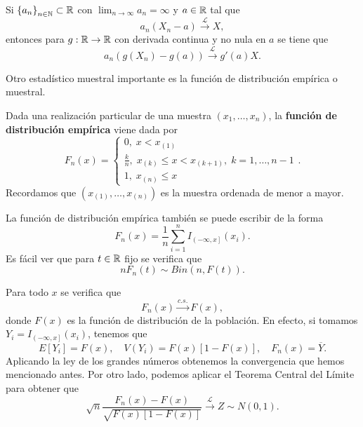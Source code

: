 \begin{lema}
	Si $\displaystyle \left\{ a_{n}\right\} _{n\in\mathbb{N}}\subset \mathbb{R} $ con $\displaystyle \lim_{n \to \infty}a_{n}=\infty $ y $\displaystyle a \in \mathbb{R} $ tal que 
	\[a_{n}\left(X_{n}-a\right)\xrightarrow{\mathcal{L}} X ,\]
	entonces para $\displaystyle g : \mathbb{R} \to \mathbb{R} $ con derivada continua y no nula en $\displaystyle a $ se tiene que 
	\[a_{n}\left(g\left(X_{n}\right)-g\left(a\right)\right)\xrightarrow{\mathcal{L}} g'\left(a\right)X .\]
\end{lema}
Otro estadístico muestral importante es la función de distribución empírica o muestral.
\begin{definition}
Dada una realización particular de una muestra $\displaystyle \left(x_{1}, \ldots, x_{n}\right) $, la \textbf{función de distribución empírica} viene dada por
\[ F_{n}\left(x\right)=
\begin{cases}
0, \; x < x_{\left(1\right)} \\
\frac{k}{n}, \; x_{\left(k\right)} \leq x < x_{\left(k+1\right)}, \; k = 1, \ldots, n-1 \\
1, \; x_{\left(n\right)}\leq x
\end{cases}
.\]
Recordamos que $\displaystyle \left(x_{\left(1\right)}, \ldots, x_{\left(n\right)}\right) $ es la muestra ordenada de menor a mayor.
\end{definition}
La función de distribución empírica también se puede escribir de la forma
\[F_{n}\left(x\right)=\frac{1}{n}\sum^{n}_{i = 1}I_{\left(-\infty, x\right]}\left(x_{i}\right) .\]
Es fácil ver que para $\displaystyle t \in \mathbb{R} $ fijo se verifica que 
\[nF_{n}\left(t\right)\sim Bin\left(n, F\left(t\right)\right) .\]
\begin{observation}
Para todo $\displaystyle x $ se verifica que 
\[F_{n}\left(x\right)\xrightarrow{c.s.}F\left(x\right) ,\]
donde $\displaystyle F\left(x\right) $ es la función de distribución de la población. En efecto, si tomamos $\displaystyle Y_{i}=I_{\left(-\infty, x\right]}\left(x_{i}\right) $, tenemos que 
\[E\left[Y_{i}\right] = F\left(x\right), \quad V\left(Y_{i}\right)=F\left(x\right)\left[1-F\left(x\right)\right] , \quad F_{n}\left(x\right)=\overline{Y} .\]
Aplicando la ley de los grandes números obtenemos la convergencia que hemos mencionado antes. Por otro lado, podemos aplicar el Teorema Central del Límite para obtener que
\[\sqrt{n}\frac{F_{n}\left(x\right) - F\left(x\right)}{\sqrt{F\left(x\right)\left[1-F\left(x\right)\right] }}\xrightarrow{\mathcal{L}} Z \sim N\left(0,1\right).\]
\end{observation}
